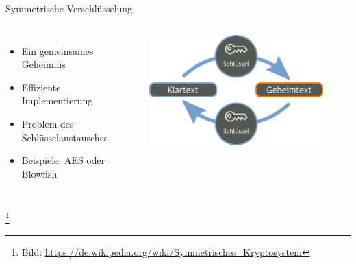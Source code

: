 \documentclass[10pt]{beamer}
\newcommand\blfootnote[1]{%
	\begingroup
	\renewcommand\thefootnote{}\footnote{#1}%
	\addtocounter{footnote}{-1}%
	\endgroup
}
\begin{document}
%
%
\begin{frame}[fragile]{Symmetrische Verschlüsselung}
\begin{columns}[T,c,onlytextwidth]
	\begin{itemize}
		\item Ein gemeinsames Geheimnis
		\item Effiziente Implementierung
		\item Problem des Schlüsselaustausches
		\item Beispiele: AES oder Blowfish 
	\end{itemize}
	\begin{figure}
		\includegraphics[width=1\textwidth]{images/sym}
	\end{figure}
\end{columns}
\blfootnote{Bild: \href{https://de.wikipedia.org/wiki/Symmetrisches_Kryptosystem}{https://de.wikipedia.org/wiki/Symmetrisches\_Kryptosystem}}
\end{frame}
\end{document}
